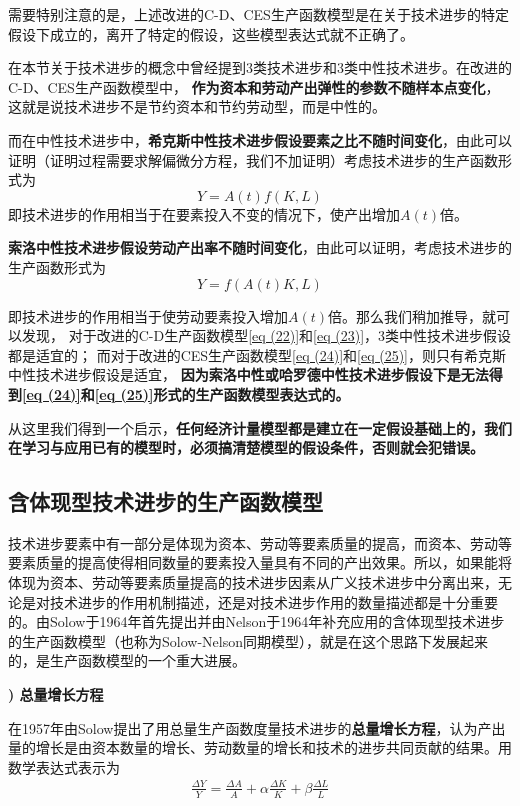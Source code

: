 	需要特别注意的是，上述改进的C-D、CES生产函数模型是在关于技术进步的特定假设下成立的，离开了特定的假设，这些模型表达式就不正确了。
		
	在本节关于技术进步的概念中曾经提到3类技术进步和3类中性技术进步。在改进的C-D、CES生产函数模型中，
	\textbf{作为资本和劳动产出弹性的参数不随样本点变化}，这就是说技术进步不是节约资本和节约劳动型，而是中性的。
		
	而在中性技术进步中，\textbf{希克斯中性技术进步假设要素之比不随时间变化}，由此可以证明（证明过程需要求解偏微分方程，我们不加证明）考虑技术进步的生产函数形式为
	$$ Y = A\left (t\right) f\left ( K,L \right ) $$
	即技术进步的作用相当于在要素投入不变的情况下，使产出增加$ A\left ( t \right ) $倍。
		
	\textbf{索洛中性技术进步假设劳动产出率不随时间变化}，由此可以证明，考虑技术进步的生产函数形式为
	$$ Y = f\left ( A\left ( t \right ) K,L \right ) $$
		
	即技术进步的作用相当于使劳动要素投入增加$ A\left ( t \right ) $倍。那么我们稍加推导，就可以发现，
	对于改进的C-D生产函数模型\eqref{eq (22)}和\eqref{eq (23)}，3类中性技术进步假设都是适宜的；
	而对于改进的CES生产函数模型\eqref{eq (24)}和\eqref{eq (25)}，则只有希克斯中性技术进步假设是适宜，
	\textbf{因为索洛中性或哈罗德中性技术进步假设下是无法得到\eqref{eq (24)}和\eqref{eq (25)}形式的生产函数模型表达式的。}
		
	从这里我们得到一个启示，\textbf{任何经济计量模型都是建立在一定假设基础上的，我们在学习与应用已有的模型时，必须搞清楚模型的假设条件，否则就会犯错误。}
		
\subsection{含体现型技术进步的生产函数模型}
		
	技术进步要素中有一部分是体现为资本、劳动等要素质量的提高，而资本、劳动等要素质量的提高使得相同数量的要素投入量具有不同的产出效果。所以，如果能将体现为资本、劳动等要素质量提高的技术进步因素从广义技术进步中分离出来，无论是对技术进步的作用机制描述，还是对技术进步作用的数量描述都是十分重要的。由Solow于1964年首先提出并由Nelson于1964年补充应用的含体现型技术进步的生产函数模型（也称为Solow-Nelson同期模型），就是在这个思路下发展起来的，是生产函数模型的一个重大进展。
		
{\bf {}) 总量增长方程}
		
	在1957年由Solow提出了用总量生产函数度量技术进步的\textbf{总量增长方程}，认为产出量的增长是由资本数量的增长、劳动数量的增长和技术的进步共同贡献的结果。用数学表达式表示为  
	\begin{align}
		\frac{\Delta Y}{Y}=\frac{\Delta A}{A}+\alpha \frac{\Delta K}{K}+\beta \frac{\Delta L}{L} \label{eq (26)}
	\end{align}
		
